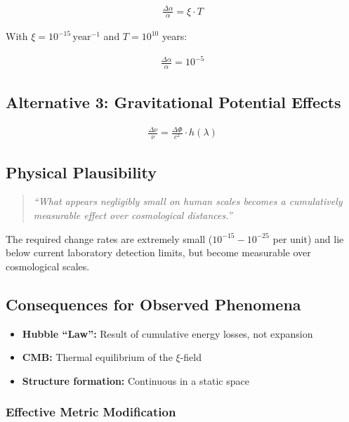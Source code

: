 \documentclass{article}
\begin{document}
\begin{align}
	\frac{\Delta\alpha}{\alpha} = \xi \cdot T
\end{align}

With $\xi = 10^{-15} \, \text{year}^{-1}$ and $T = 10^{10}$ years:

\begin{align}
	\frac{\Delta\alpha}{\alpha} = 10^{-5}
\end{align}

\subsection{Alternative 3: Gravitational Potential Effects}

\begin{align}
	\frac{\Delta\nu}{\nu} = \frac{\Delta\Phi}{c^2} \cdot h(\lambda)
\end{align}

\subsection{Physical Plausibility}

\begin{quote}
	\textit{``What appears negligibly small on human scales becomes a cumulatively measurable effect over cosmological distances.''}
\end{quote}

The required change rates are extremely small ($10^{-15} - 10^{-25}$ per unit) and lie below current laboratory detection limits, but become measurable over cosmological scales.

\subsection{Consequences for Observed Phenomena}

\begin{itemize}
	\item \textbf{Hubble ``Law'':} Result of cumulative energy losses, not expansion
	\item \textbf{CMB:} Thermal equilibrium of the $\xi$-field  
	\item \textbf{Structure formation:} Continuous in a static space
\end{itemize}
	\subsubsection{Effective Metric Modification}
	
\end{document}
